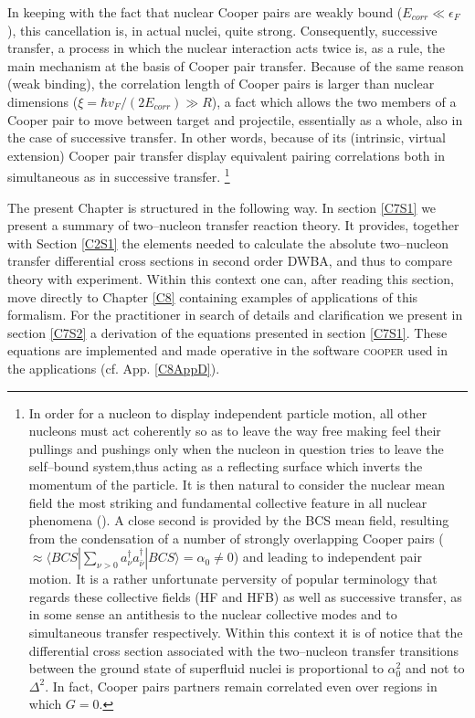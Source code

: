 In keeping with the fact that nuclear Cooper pairs are weakly bound ($E_{corr}\ll \epsilon_F$), this cancellation is, in actual nuclei, quite strong. Consequently, successive transfer, a process in which the nuclear interaction acts twice is, as a rule, the main mechanism at the basis of Cooper pair transfer. Because of the same reason (weak binding), the correlation length of Cooper pairs is larger than nuclear dimensions ($\xi=\hbar v_F/(2E_{corr})\gg R$), a fact which allows the two members of a Cooper pair to move between target and projectile, essentially as a whole, also in the case of successive transfer. In other words, because of its (intrinsic, virtual extension) Cooper pair transfer display equivalent 	pairing correlations both in simultaneous as in successive transfer. \footnote{In order for a nucleon to display independent particle motion, all other nucleons must act coherently so as to leave the way free making feel their pullings and pushings only when the nucleon in question tries to leave the self--bound system,thus acting as a reflecting surface which inverts the momentum of the particle. It is then natural to consider the nuclear mean field the most striking and fundamental collective feature in all nuclear phenomena (\cite{Mottelson:62}). A close second is provided by the BCS mean field, resulting from the condensation of a number of strongly overlapping Cooper pairs ($ \approx \langle BCS|\sum_{\nu>0}a^\dagger_\nu a^\dagger_{\bar\nu}|BCS\rangle=\alpha_0\neq 0$) and leading to independent pair motion. It is a rather unfortunate perversity of popular terminology that regards these collective fields (HF and HFB) as well as successive transfer, as in some sense an antithesis to the nuclear collective modes  and to simultaneous transfer respectively. Within this context it is of notice that the  differential cross section associated with the two--nucleon transfer  transitions	between the ground state of superfluid nuclei is proportional to $\alpha_0^2$ and not to $\Delta^2$. In fact, Cooper pairs partners remain correlated even over regions in which $G=0$.}


 



The present Chapter is structured in the following way. In section \ref{C7S1} we present a summary of two--nucleon transfer reaction theory. It provides, together with Section \ref{C2S1} the elements needed to calculate the absolute two--nucleon transfer differential cross sections in second order DWBA, and thus to compare theory with experiment. Within this context one can, after reading this section, move directly to   Chapter \ref{C8} containing examples of  applications of this formalism.
For the practitioner in search of details and clarification we present in section \ref{C7S2}  a  derivation of the equations presented in section \ref{C7S1}. These equations are implemented and made operative  in the software \textsc{cooper}  used in the applications (cf. App. \ref{C8AppD}).

